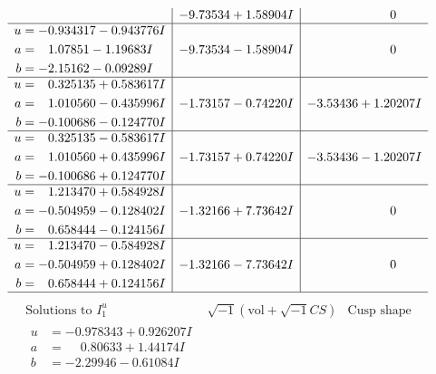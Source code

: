\documentclass[1p]{elsarticle_modified}
\theoremstyle{definition}
\newcommand{\I}{\sqrt{-1}}
\begin{document}
$$\begin{array}{c|c|c}
 & -9.73534 + 1.58904 I & \phantom{-0.000000 } 0 \\ \hline\begin{aligned}
u &= -0.934317 - 0.943776 I \\
a &= \phantom{-}1.07851 - 1.19683 I \\
b &= -2.15162 - 0.09289 I\end{aligned}
 & -9.73534 - 1.58904 I & \phantom{-0.000000 } 0 \\ \hline\begin{aligned}
u &= \phantom{-}0.325135 + 0.583617 I \\
a &= \phantom{-}1.010560 - 0.435996 I \\
b &= -0.100686 - 0.124770 I\end{aligned}
 & -1.73157 - 0.74220 I & -3.53436 + 1.20207 I \\ \hline\begin{aligned}
u &= \phantom{-}0.325135 - 0.583617 I \\
a &= \phantom{-}1.010560 + 0.435996 I \\
b &= -0.100686 + 0.124770 I\end{aligned}
 & -1.73157 + 0.74220 I & -3.53436 - 1.20207 I \\ \hline\begin{aligned}
u &= \phantom{-}1.213470 + 0.584928 I \\
a &= -0.504959 - 0.128402 I \\
b &= \phantom{-}0.658444 - 0.124156 I\end{aligned}
 & -1.32166 + 7.73642 I & \phantom{-0.000000 } 0 \\ \hline\begin{aligned}
u &= \phantom{-}1.213470 - 0.584928 I \\
a &= -0.504959 + 0.128402 I \\
b &= \phantom{-}0.658444 + 0.124156 I\end{aligned}
 & -1.32166 - 7.73642 I & \phantom{-0.000000 } 0\\
 \hline 
 \end{array}$$\newpage$$\begin{array}{c|c|c}  
\text{Solutions to }I^u_{1}& \I (\text{vol} + \sqrt{-1}CS) & \text{Cusp shape}\\
 \hline 
\begin{aligned}
u &= -0.978343 + 0.926207 I \\
a &= \phantom{-}0.80633 + 1.44174 I \\
b &= -2.29946 - 0.61084 I\end{aligned}

\end{array}$$
\end{document}

